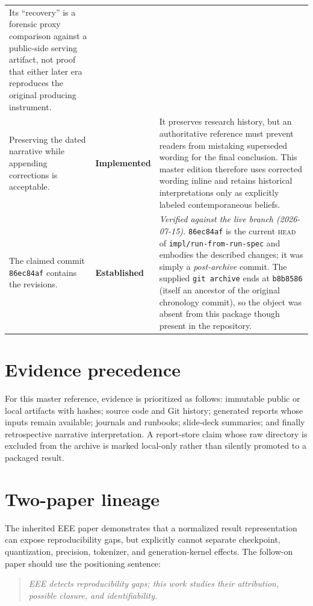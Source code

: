 \documentclass[11pt]{report}
\newcommand{\code}[1]{\texttt{#1}}
\newcommand{\statusEstablished}{\textbf{Established}}
\newcommand{\statusImplemented}{\textbf{Implemented}}
\begin{document}
\begin{longtable}{@{}p{}p{}p{}@{}}
Its ``recovery'' is a forensic proxy comparison against a public-side serving
artifact, not proof that either later era reproduces the original producing
instrument. \\
Preserving the dated narrative while appending corrections is acceptable. &
\statusImplemented & It preserves research history, but an authoritative reference
must prevent readers from mistaking superseded wording for the final conclusion.
This master edition therefore uses corrected wording inline and retains historical
interpretations only as explicitly labeled contemporaneous beliefs. \\
The claimed commit \code{86ec84af} contains the revisions. & \statusEstablished &
\emph{Verified against the live branch (2026-07-15).} \code{86ec84af} is the current
\textsc{head} of \code{impl/run-from-run-spec} and embodies the described changes; it
was simply a \emph{post-archive} commit. The supplied \code{git archive} ends at
\code{b8b8586} (itself an ancestor of the original chronology commit), so the object
was absent from this package though present in the repository. \\
\bottomrule
\end{longtable}

\section{Evidence precedence}

For this master reference, evidence is prioritized as follows: immutable public or
local artifacts with hashes; source code and Git history; generated reports whose
inputs remain available; journals and runbooks; slide-deck summaries; and finally
retrospective narrative interpretation. A report-store claim whose raw directory is
excluded from the archive is marked local-only rather than silently promoted to a
packaged result.

\section{Two-paper lineage}

The inherited EEE paper demonstrates that a normalized result representation can
expose reproducibility gaps, but explicitly cannot separate checkpoint,
quantization, precision, tokenizer, and generation-kernel effects. The follow-on
paper should use the positioning sentence:

\begin{quote}\itshape
EEE detects reproducibility gaps; this work studies their attribution, possible
closure, and identifiability.
\end{quote}
\end{document}
